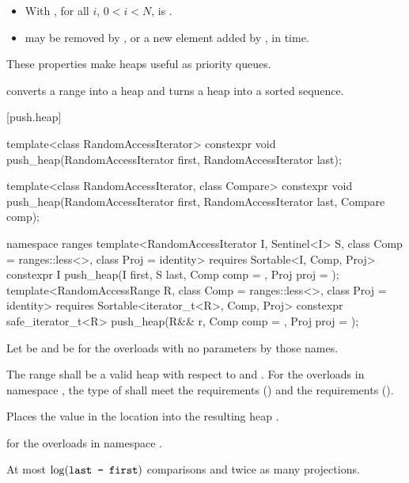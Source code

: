 \begin{itemize}
\item With , for all $i$, $0 < i < N$,
is .
\item {}
may be removed by
,
or a new element added by
,
in
time.
\end{itemize}

\pnum
These properties make heaps useful as priority queues.

\pnum
{}
converts a range into a heap and
turns a heap into a sorted sequence.

[push.heap]{}

%
\begin{itemdecl}
template<class RandomAccessIterator>
  constexpr void push_heap(RandomAccessIterator first, RandomAccessIterator last);

template<class RandomAccessIterator, class Compare>
  constexpr void push_heap(RandomAccessIterator first, RandomAccessIterator last,
                           Compare comp);

namespace ranges {
  template<RandomAccessIterator I, Sentinel<I> S, class Comp = ranges::less<>,
      class Proj = identity>
    requires Sortable<I, Comp, Proj>
    constexpr I
      push_heap(I first, S last, Comp comp = {}, Proj proj = {});
  template<RandomAccessRange R, class Comp = ranges::less<>, class Proj = identity>
    requires Sortable<iterator_t<R>, Comp, Proj>
    constexpr safe_iterator_t<R>
      push_heap(R&& r, Comp comp = {}, Proj proj = {});
}
\end{itemdecl}

\begin{itemdescr}
\pnum
Let  be 
and  be 
for the overloads with no parameters by those names.

\pnum
\requires
The range
shall be a valid heap with respect to  and .
For the overloads in namespace ,
the type of  shall meet
the  requirements
() and the
 requirements
().

\pnum
\effects
Places the value in the location
into the resulting heap
.

\pnum
\returns
{} for the overloads in namespace .

\pnum
\complexity
At most
$\log(\texttt{last - first})$
comparisons and twice as many projections.
\end{itemdescr}

